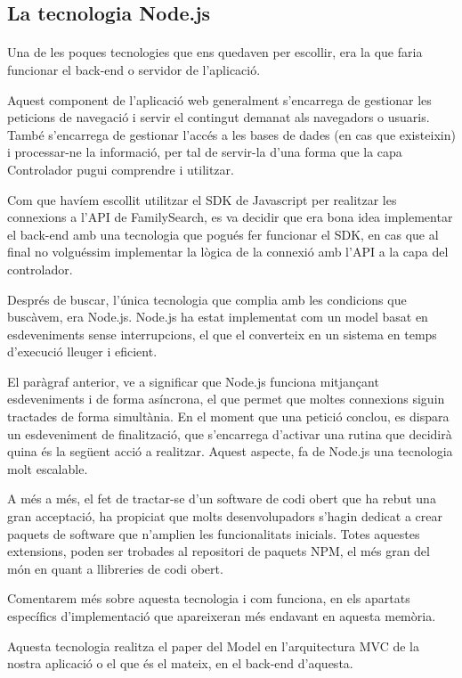 \subsection{La tecnologia Node.js}

    \paragraph{}
    Una de les poques tecnologies que ens quedaven per escollir, era la que faria funcionar el back-end o servidor de l'aplicació.

    Aquest component de l'aplicació web generalment s'encarrega de gestionar les peticions de navegació i servir el contingut demanat als navegadors o usuaris. També s'encarrega de gestionar l'accés a les bases de dades (en cas que existeixin) i processar-ne la informació, per tal de servir-la d'una forma que la capa Controlador pugui comprendre i utilitzar.

    Com que havíem escollit utilitzar el SDK de Javascript per realitzar les connexions a l'API de FamilySearch, es va decidir que era bona idea implementar el back-end amb una tecnologia que pogués fer funcionar el SDK, en cas que al final no volguéssim implementar la lògica de la connexió amb l'API a la capa del controlador.

    Després de buscar, l'única tecnologia que complia amb les condicions que bus\-cà\-vem, era Node.js. Node.js ha estat implementat com un model basat en esdeveniments sense interrupcions, el que el converteix en un sistema en temps d'execució lleuger i eficient.

    El paràgraf anterior, ve a significar que Node.js funciona mitjançant esdeveniments i de forma asíncrona, el que permet que moltes connexions siguin tractades de forma simultània. En el moment que una petició conclou, es dispara un esdeveniment de finalització, que s'encarrega d'activar una rutina que decidirà quina és la següent acció a realitzar. Aquest aspecte, fa de Node.js una tecnologia molt escalable.

    A més a més, el fet de tractar-se d'un software de codi obert que ha rebut una gran acceptació, ha propiciat que molts desenvolupadors s'hagin dedicat a crear paquets de software que n'amplien les funcionalitats inicials. Totes aquestes extensions, poden ser trobades al repositori de paquets NPM, el més gran del món en quant a llibreries de codi obert.

    Comentarem més sobre aquesta tecnologia i com funciona, en els apartats específics d'implementació que apareixeran més endavant en aquesta memòria.

    Aquesta tecnologia realitza el paper del Model en l'arquitectura MVC de la nostra aplicació o el que és el mateix, en el back-end d'aquesta.
